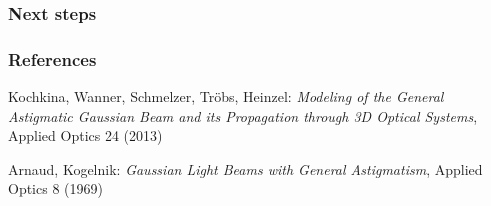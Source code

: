 \documentclass{beamer}
\begin{document}
\begin{frame}
\frametitle{Next steps}

\end{frame}


\begin{frame}

\frametitle{References}

\begin{thebibliography}{99} 

Kochkina, Wanner, Schmelzer, Tr\"obs, Heinzel:
\textit{Modeling of the General Astigmatic Gaussian Beam and its Propagation through 3D Optical Systems},
Applied Optics 24 (2013)

Arnaud, Kogelnik:
\textit{Gaussian Light Beams with General Astigmatism},
Applied Optics 8 (1969)

\end{thebibliography}

\end{frame}
\end{document}
